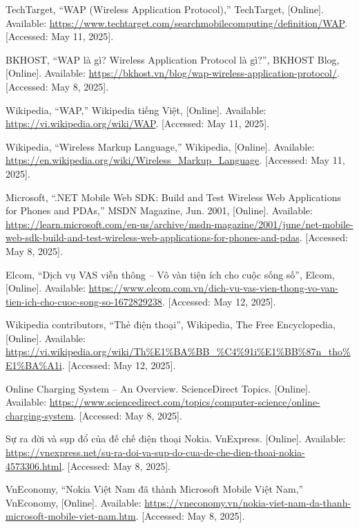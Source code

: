 \documentclass[12pt]{report}
\begin{document}
\begin{thebibliography}{1}
  TechTarget, “WAP (Wireless Application Protocol),” TechTarget, [Online]. Available: \url{https://www.techtarget.com/searchmobilecomputing/definition/WAP}. [Accessed: May 11, 2025].


  BKHOST, “WAP là gì? Wireless Application Protocol là gì?”, BKHOST Blog, [Online]. Available: \url{https://bkhost.vn/blog/wap-wireless-application-protocol/}. [Accessed: May 8, 2025].


  Wikipedia, “WAP,” Wikipedia tiếng Việt, [Online]. Available: \url{https://vi.wikipedia.org/wiki/WAP}. [Accessed: May 11, 2025].


  Wikipedia, “Wireless Markup Language,” Wikipedia, [Online]. Available: \url{https://en.wikipedia.org/wiki/Wireless_Markup_Language}. [Accessed: May 11, 2025].

  Microsoft, “.NET Mobile Web SDK: Build and Test Wireless Web Applications for Phones and PDAs,” MSDN Magazine, Jun. 2001, [Online]. Available: \url{https://learn.microsoft.com/en-us/archive/msdn-magazine/2001/june/net-mobile-web-sdk-build-and-test-wireless-web-applications-for-phones-and-pdas}. [Accessed: May 8, 2025].

  Elcom, “Dịch vụ VAS viễn thông – Vô vàn tiện ích cho cuộc sống số”, Elcom, [Online]. Available: \url{https://www.elcom.com.vn/dich-vu-vas-vien-thong-vo-van-tien-ich-cho-cuoc-song-so-1672829238}. [Accessed: May 12, 2025].


  Wikipedia contributors, “Thẻ điện thoại”, Wikipedia, The Free Encyclopedia, [Online]. Available: \url{https://vi.wikipedia.org/wiki/Th%E1%BA%BB_%C4%91i%E1%BB%87n_tho%E1%BA%A1i}. [Accessed: May 12, 2025].

  Online Charging System – An Overview. ScienceDirect Topics. [Online]. Available: \url{https://www.sciencedirect.com/topics/computer-science/online-charging-system}. [Accessed: May 8, 2025].


  Sự ra đời và sụp đổ của đế chế điện thoại Nokia. VnExpress. [Online]. Available: \url{https://vnexpress.net/su-ra-doi-va-sup-do-cua-de-che-dien-thoai-nokia-4573306.html}. [Accessed: May 8, 2025].


  VnEconomy, “Nokia Việt Nam đã thành Microsoft Mobile Việt Nam,” VnEconomy, [Online]. Available: \url{https://vneconomy.vn/nokia-viet-nam-da-thanh-microsoft-mobile-viet-nam.htm}. [Accessed: May 8, 2025].


\end{thebibliography}
\end{document}
